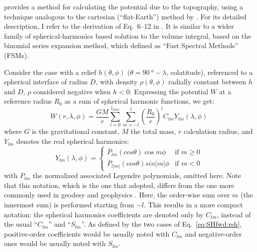 \Textcite{Wieczorek2007} provides a method for calculating the potential due to the topography, using a technique analogous to the cartesian (``flat-Earth'') method by \textcite{Parker1973}.
For its detailed description, I refer to the derivation of Eq.~6--12 in \textcite{Wieczorek1998}.
It is similar to a wider family of spherical-harmonics based solution to the volume integral, based on the binomial series expansion method, which \textcite{Root2015} defined as ``Fast Spectral Methods'' (FSMs).

Consider the case with a relief $h(\theta, \phi)$ ($\theta = \SI{90}{\degree} - \lambda$, colatitude), referenced to a spherical interface of radius $D$, with density $\rho(\theta, \phi)$ radially constant between $h$ and $D$, $\rho$ considered negative when $h<0$.
Expressing the potential $W$ at a reference radius $R_0$ as a sum of spherical harmonic functions, we get:
\begin{equation}
    \label{eq:SHfwd:pot}
    W(r, \lambda, \phi) =
    \frac{GM}{r}
    \sum_{l=0}^{l_{max}}
    \sum_{m=-l}^{l}
    \left( \frac{R_0}{r} \right)^l
    C_{lm} Y_{lm} (\lambda, \phi)
\end{equation}
where $G$ is the gravitational constant, $M$ the total mass, $r$ calculation radius, and $Y_{lm}$ denotes the real spherical harmonics:
\begin{equation}
    \label{eq:SHfwd:rsh}
    Y_{lm}(\lambda, \phi) =
    \begin{cases}
        \overline{P}_{lm} (cos \theta) \cos m \phi & \mbox{if } m \ge 0 \\
        \overline{P}_{l|m|} (cos \theta) sin |m| \phi & \mbox{if } m < 0
    \end{cases}
\end{equation}
with $P_{lm}$ the normalized associated Legendre polynomials, omitted here.
Note that this notation, which is the one that \textcite{Wieczorek2007} adopted, differs from the one more commonly used in geodesy and geophysics \parencite[e.g.][]{HofmannWellenhof2006}.
Here, the order-wise sum over $m$ (the innermost sum) is performed starting from $-l$.
This results in a more compact notation: the spherical harmonics coefficients are denoted only by $C_{lm}$, instead of the usual ``$C_{lm}$'' and ``$S_{lm}$''.
As defined by the two cases of Eq.~\ref{eq:SHfwd:rsh}, positive-order coefficients would be usually noted with $C_{lm}$ and negative-order ones would be usually noted with $S_{lm}$.

